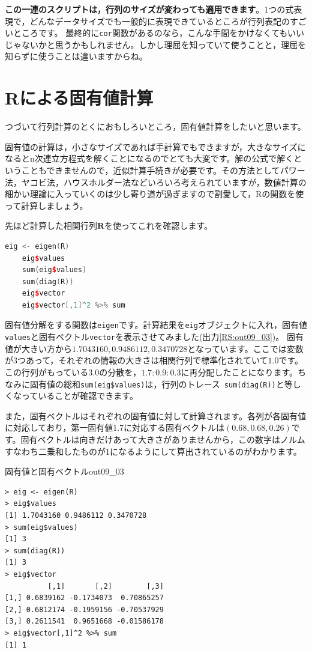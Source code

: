 \documentclass{ltjsbook}
\begin{document}
\textbf{この一連のスクリプトは，行列のサイズが変わっても適用できます}。1つの式表現で，どんなデータサイズでも一般的に表現できているところが行列表記のすごいところです。
最終的に\texttt{cor}関数があるのなら，こんな手間をかけなくてもいいじゃないかと思うかもしれません。しかし理屈を知っていて使うことと，理屈を知らずに使うことは違いますからね。

\section{Rによる固有値計算}
つづいて行列計算のとくにおもしろいところ，固有値計算をしたいと思います。

固有値の計算は，小さなサイズであれば手計算でもできますが，大きなサイズになるとn次連立方程式を解くことになるのでとても大変です。解の公式で解くということもできませんので，近似計算手続きが必要です。その方法としてパワー法，ヤコビ法，ハウスホルダー法などいろいろ考えられていますが，数値計算の細かい理論に入っていくのは少し寄り道が過ぎますので割愛して，Rの関数を使って計算しましょう。

先ほど計算した相関行列$\bm{R}$を使ってこれを確認します。

\begin{lstlisting}[language=c++,label={code:09_08},caption={相関行列の固有値分解}]
    eig <- eigen(R)
    eig$values
    sum(eig$values)
    sum(diag(R))
    eig$vector
    eig$vector[,1]^2 %>% sum
\end{lstlisting}

固有値分解をする関数は\texttt{eigen}です。計算結果を\texttt{eig}オブジェクトに入れ，固有値\verb|values|と固有ベクトル\verb|vector|を表示させてみました(出力\ref{RS:out09_03})。
固有値が大きい方から$1.7043160,0.9486112,0.3470728$となっています。ここでは変数が3つあって，それぞれの情報の大きさは相関行列で標準化されていて$1.0$です。この行列がもっている$3.0$の分散を，$1.7 : 0.9 : 0.3$に再分配したことになります。ちなみに固有値の総和\verb|sum(eig$values)|は，行列のトレース\verb| sum(diag(R))|と等しくなっていることが確認できます。

また，固有ベクトルはそれぞれの固有値に対して計算されます。各列が各固有値に対応しており，第一固有値1.7に対応する固有ベクトルは$(0.68,0.68,0.26)$です。固有ベクトルは向きだけあって大きさがありませんから，この数字はノルムすなわち二乗和したものが1になるようにして算出されているのがわかります。
\begin{Rscreen}{固有値と固有ベクトル}{out09_03}
	\begin{verbatim}
> eig <- eigen(R)
> eig$values
[1] 1.7043160 0.9486112 0.3470728
> sum(eig$values)
[1] 3
> sum(diag(R))
[1] 3
> eig$vector
          [,1]       [,2]        [,3]
[1,] 0.6839162 -0.1734073  0.70865257
[2,] 0.6812174 -0.1959156 -0.70537929
[3,] 0.2611541  0.9651668 -0.01586178
> eig$vector[,1]^2 %>% sum
[1] 1
\end{verbatim}
\end{Rscreen}
\end{document}
